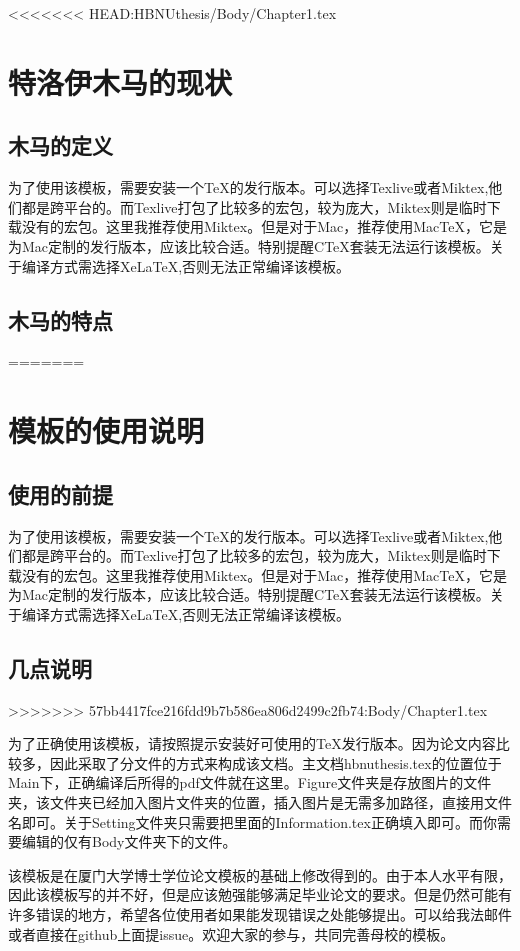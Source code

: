 <<<<<<< HEAD:HBNUthesis/Body/Chapter1.tex
\chapter{特洛伊木马的现状}
\section{木马的定义}
为了使用该模板，需要安装一个TeX的发行版本。可以选择Texlive或者Miktex,他们都是跨平台的。而Texlive打包了比较多的宏包，较为庞大，Miktex则是临时下载没有的宏包。这里我推荐使用Miktex。但是对于Mac，推荐使用MacTeX，它是为Mac定制的发行版本，应该比较合适。特别提醒CTeX套装无法运行该模板。关于编译方式需选择XeLaTeX,否则无法正常编译该模板。


\section{木马的特点}
=======
\chapter{模板的使用说明}
\section{使用的前提}
为了使用该模板，需要安装一个TeX的发行版本。可以选择Texlive或者Miktex,他们都是跨平台的。而Texlive打包了比较多的宏包，较为庞大，Miktex则是临时下载没有的宏包。这里我推荐使用Miktex。但是对于Mac，推荐使用MacTeX，它是为Mac定制的发行版本，应该比较合适。特别提醒CTeX套装无法运行该模板。关于编译方式需选择XeLaTeX,否则无法正常编译该模板。


\section{几点说明}
>>>>>>> 57bb4417fce216fdd9b7b586ea806d2499c2fb74:Body/Chapter1.tex

为了正确使用该模板，请按照提示安装好可使用的TeX发行版本。因为论文内容比较多，因此采取了分文件的方式来构成该文档。主文档hbnuthesis.tex的位置位于Main下，正确编译后所得的pdf文件就在这里。Figure文件夹是存放图片的文件夹，该文件夹已经加入图片文件夹的位置，插入图片是无需多加路径，直接用文件名即可。关于Setting文件夹只需要把里面的Information.tex正确填入即可。而你需要编辑的仅有Body文件夹下的文件。

该模板是在厦门大学博士学位论文模板的基础上修改得到的。由于本人水平有限，因此该模板写的并不好，但是应该勉强能够满足毕业论文的要求。但是仍然可能有许多错误的地方，希望各位使用者如果能发现错误之处能够提出。可以给我法邮件或者直接在github上面提issue。欢迎大家的参与，共同完善母校的模板。
